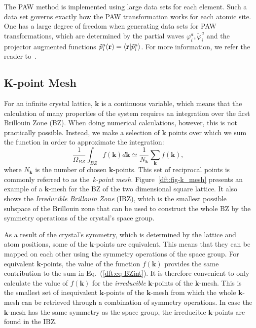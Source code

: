 \begin{refsection}
The PAW method is implemented using large data sets for each element. Such a 
data set governs exactly how the PAW transformation works for each atomic 
site. One has a large degree of freedom when generating data sets for PAW 
transformations, which are determined by the partial waves 
$\varphi_i^a,\tilde{\varphi}_i^a$ and the projector augmented functions 
$\tilde{p}_i^a(\mathbf{r}) = \braket{\mathbf{r} |\tilde{p}_i^a}$. For more 
information, we refer the reader to~\cite{Rostgaard2009}. 
 
\subsection{K-point Mesh} \label{dft:sec-kpoints} 
 
For an infinite crystal lattice, $\mathbf{k}$ is a continuous variable, which 
means that the calculation of many properties of the system requires an 
integration over the first Brillouin Zone (BZ). When doing numerical 
calculations, however, this is not practically possible. Instead, we make a 
selection of $\mathbf{k}$ points over which we sum the function in order to 
approximate the integration: 
\begin{equation} \label{dft:eq-BZint} 
\frac{1}{\Omega_{BZ}}\int_{BZ} f(\mathbf{k}) d\mathbf{k} \simeq 
\frac{1}{N_\mathbf{k}} \sum_\mathbf{k} f(\mathbf{k}), 
\end{equation} 
where $N_\mathbf{k}$ is the number of chosen $\mathbf{k}$-points. This set of 
reciprocal points is commonly referred to as the~\textit{k-point mesh}. 
Figure~\ref{dft:fig-k_mesh} presents an example of a $\mathbf{k}$-mesh for the BZ 
of the two dimensional square lattice. It also shows the \textit{Irreducible 
Brillouin Zone} (IBZ), which is the smallest possible subspace of the 
Brillouin zone that can be used to construct the whole BZ by the symmetry 
operations of the crystal's space group.  
 
As a result of the crystal's symmetry, which is determined by the lattice and 
atom positions, some of the $\mathbf{k}$-points are equivalent. This means 
that they can be mapped on each other using the symmetry operations of the 
space group. For equivalent $\mathbf{k}$-points, the value of the function 
$f(\mathbf{k})$ provides the same contribution to the sum in 
Eq.~(\ref{dft:eq-BZint}). It is therefore convenient to only calculate the value 
of $f(\mathbf{k})$ for the \textit{irreducible} $\mathbf{k}$-points of the 
$\mathbf{k}$-mesh. This is the smallest set of inequivalent 
$\mathbf{k}$-points of the $\mathbf{k}$-mesh from which the whole 
$\mathbf{k}$-mesh can be retrieved through a combination of symmetry 
operations. In case the $\mathbf{k}$-mesh has the same symmetry as the space 
group, the irreducible $\mathbf{k}$-points are found in the IBZ. 
 

\end{refsection}
